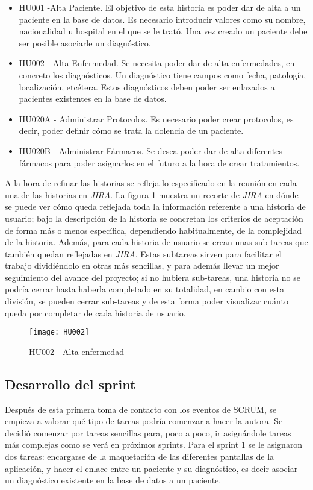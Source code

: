 \begin{itemize}
\item HU001 -Alta Paciente. El objetivo de esta historia es poder dar de alta a un paciente en la base de datos. Es necesario introducir valores como su nombre, nacionalidad u hospital en el que se le trató. Una vez creado un paciente debe ser posible asociarle un diagnóstico.
\item HU002 - Alta Enfermedad. Se necesita poder dar de alta enfermedades, en concreto los diagnósticos. Un diagnóstico tiene campos como fecha, patología, localización, etcétera. Estos diagnósticos deben poder ser enlazados a pacientes existentes en la base de datos.
\item HU020A - Administrar Protocolos. Es necesario poder crear protocolos, es decir, poder definir cómo se trata la dolencia de un paciente.
\item HU020B - Administrar Fármacos. Se desea poder dar de alta diferentes fármacos para poder asignarlos en el futuro a la hora de crear tratamientos.
\end{itemize}

A la hora de refinar las historias se refleja lo especificado en la reunión en cada una de las historias en \emph{JIRA}. La figura \ref{fig:HU002} muestra un recorte de \emph{JIRA} en dónde se puede ver cómo queda reflejada toda la información referente a una historia de usuario; bajo la descripción de la historia se concretan los criterios de aceptación de forma más o menos específica, dependiendo habitualmente, de la complejidad de la historia. Además, para cada historia de usuario se crean unas sub-tareas que también quedan reflejadas en \emph{JIRA}. Estas subtareas sirven para facilitar el trabajo dividiéndolo en otras más sencillas, y para además llevar un mejor seguimiento del avance del proyecto; si no hubiera sub-tareas, una historia no se podría cerrar hasta haberla completado en su totalidad, en cambio con esta división, se pueden cerrar sub-tareas y de esta forma poder visualizar cuánto queda por completar de cada historia de usuario.

\begin{figure}[!h]
\begin{center}
\texttt{[image: HU002]}
\caption{HU002 - Alta enfermedad}
\label{fig:HU002}
\end{center}
\end{figure}


\subsection{Desarrollo del sprint}
\label{subsec:S1-desarrollo}
Después de esta primera toma de contacto con los eventos de SCRUM, se empieza a valorar qué tipo de tareas podría comenzar a hacer la autora. Se decidió comenzar por tareas sencillas para, poco a poco, ir asignándole tareas más complejas como se verá en próximos sprints. 
Para el sprint 1 se le asignaron dos tareas: encargarse de la maquetación de las diferentes pantallas de la aplicación, y hacer el enlace entre un paciente y su diagnóstico, es decir asociar un diagnóstico existente en la base de datos a un paciente.


